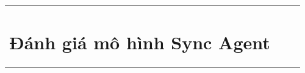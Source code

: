 \begin{table}[!htp]
\begin{tabular}{@{}lccc@{}}


\section{Đánh giá mô hình Sync Agent}

    
        
        

        

\end{tabular}
\end{table}
